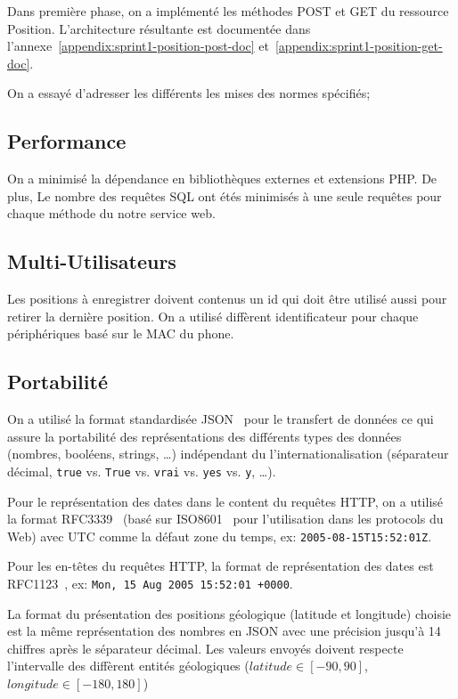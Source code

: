 Dans première phase, on a implémenté les méthodes POST et GET du ressource
Position. L'architecture résultante est documentée dans
l'annexe~\ref{appendix:sprint1-position-post-doc}
et~\ref{appendix:sprint1-position-get-doc}.

On a essayé d'adresser les différents les mises des normes spécifiés;

\subsection{Performance}

On a minimisé la dépendance en bibliothèques externes et extensions PHP\@. De
plus, Le nombre des requêtes SQL ont étés minimisés à une seule requêtes pour
chaque méthode du notre service web.

\subsection{Multi-Utilisateurs}

Les positions à enregistrer doivent contenus un id qui doit être utilisé aussi
pour retirer la dernière position. On a utilisé diffèrent identificateur pour
chaque périphériques basé sur le MAC du phone.

\subsection{Portabilité}

On a utilisé la format standardisée JSON~\cite{ECMA-404} pour le transfert de
données ce qui assure la portabilité des représentations des différents types
des données (nombres, booléens, strings, \ldots) indépendant du
l'internationalisation (séparateur décimal, \verb|true| vs. \verb|True| vs.
\verb|vrai| vs. \verb|yes| vs. \verb|y|, \ldots).

Pour le représentation des dates dans le content du requêtes HTTP, on a utilisé
la format RFC3339~\cite{RFC3339} (basé sur ISO8601~\cite{ISO8601} pour
l'utilisation dans les protocols du Web) avec UTC comme la défaut zone du
temps, ex: \verb|2005-08-15T15:52:01Z|.

Pour les en-têtes du requêtes HTTP, la format de représentation des dates est
RFC1123~\cite{RFC1123}, ex: \verb|Mon, 15 Aug 2005 15:52:01 +0000|.

La format du présentation des positions géologique (latitude et longitude)
choisie est la même représentation des nombres en JSON avec une précision
jusqu'à 14 chiffres après le séparateur décimal. Les valeurs envoyés doivent
respecte l'intervalle des diffèrent entités géologiques ($latitude \in [-90,
90]$, $longitude \in [-180, 180]$)

